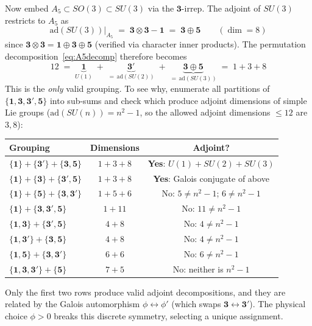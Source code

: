 \documentclass[12pt,a4paper]{article}
\theoremstyle{definition}
\begin{document}
Now embed $A_5\subset SO(3)\subset SU(3)$ via the $\mathbf{3}$-irrep.  The adjoint of $SU(3)$ restricts to $A_5$ as
\begin{equation}
\mathrm{ad}(SU(3))\big|_{A_5} \;=\; \mathbf{3}\otimes\mathbf{3} - \mathbf{1} \;=\; \mathbf{3} \oplus \mathbf{5}
\qquad (\dim = 8)
\end{equation}
since $\mathbf{3}\otimes\mathbf{3} = \mathbf{1}\oplus\mathbf{3}\oplus\mathbf{5}$ (verified via character inner products).  The permutation decomposition~\eqref{eq:A5decomp} therefore becomes
\begin{equation}
\boxed{12 \;=\; \underbrace{\mathbf{1}}_{U(1)} \;+\; \underbrace{\mathbf{3'}}_{=\,\mathrm{ad}(SU(2))} \;+\; \underbrace{\mathbf{3}\oplus\mathbf{5}}_{=\,\mathrm{ad}(SU(3))} \;=\; 1 + 3 + 8}
\label{eq:gauge138}
\end{equation}
This is the \emph{only} valid grouping.  To see why, enumerate all partitions of $\{\mathbf{1},\mathbf{3},\mathbf{3'},\mathbf{5}\}$ into sub-sums and check which produce adjoint dimensions of simple Lie groups ($\mathrm{ad}(SU(n)) = n^2 - 1$, so the allowed adjoint dimensions $\leq 12$ are $3, 8$):
\begin{center}\small
\begin{tabular}{lcc}
\toprule
\textbf{Grouping} & \textbf{Dimensions} & \textbf{Adjoint?} \\
\midrule
$\{\mathbf{1}\} + \{\mathbf{3'}\} + \{\mathbf{3},\mathbf{5}\}$ & $1 + 3 + 8$ & \textbf{Yes}: $U(1) + SU(2) + SU(3)$ \\
$\{\mathbf{1}\} + \{\mathbf{3}\} + \{\mathbf{3'},\mathbf{5}\}$ & $1 + 3 + 8$ & \textbf{Yes}: Galois conjugate of above \\
$\{\mathbf{1}\} + \{\mathbf{5}\} + \{\mathbf{3},\mathbf{3'}\}$ & $1 + 5 + 6$ & No: $5 \neq n^2\!-\!1$; $6 \neq n^2\!-\!1$ \\
$\{\mathbf{1}\} + \{\mathbf{3},\mathbf{3'},\mathbf{5}\}$ & $1 + 11$ & No: $11 \neq n^2\!-\!1$ \\
$\{\mathbf{1},\mathbf{3}\} + \{\mathbf{3'},\mathbf{5}\}$ & $4 + 8$ & No: $4 \neq n^2\!-\!1$ \\
$\{\mathbf{1},\mathbf{3'}\} + \{\mathbf{3},\mathbf{5}\}$ & $4 + 8$ & No: $4 \neq n^2\!-\!1$ \\
$\{\mathbf{1},\mathbf{5}\} + \{\mathbf{3},\mathbf{3'}\}$ & $6 + 6$ & No: $6 \neq n^2\!-\!1$ \\
$\{\mathbf{1},\mathbf{3},\mathbf{3'}\} + \{\mathbf{5}\}$ & $7 + 5$ & No: neither is $n^2\!-\!1$ \\
\bottomrule
\end{tabular}
\end{center}
Only the first two rows produce valid adjoint decompositions, and they are related by the Galois automorphism $\phi\leftrightarrow\phi'$ (which swaps $\mathbf{3}\leftrightarrow\mathbf{3'}$).  The physical choice $\phi > 0$ breaks this discrete symmetry, selecting a unique assignment.
\end{document}

